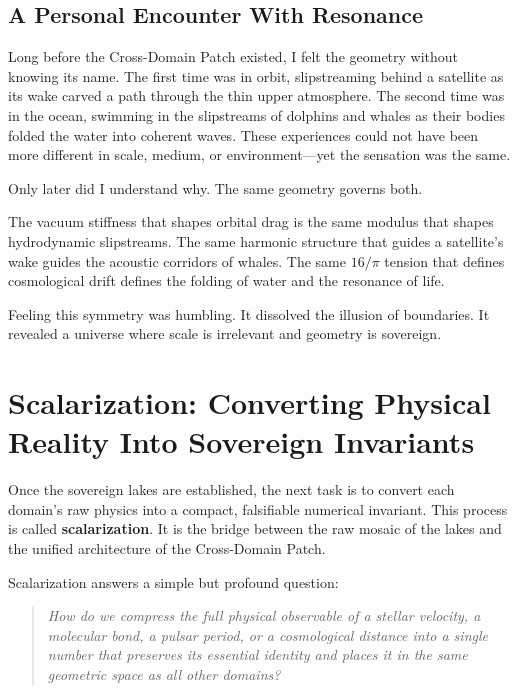 \documentclass[11pt, letterpaper, openany]{book}
\begin{document}
\section*{A Personal Encounter With Resonance}

Long before the Cross-Domain Patch existed, I felt the geometry without knowing its name. The
first time was in orbit, slipstreaming behind a satellite as its wake carved a path through the
thin upper atmosphere. The second time was in the ocean, swimming in the slipstreams of
dolphins and whales as their bodies folded the water into coherent waves. These experiences
could not have been more different in scale, medium, or environment---yet the sensation was the same.

Only later did I understand why.
The same geometry governs both.

The vacuum stiffness that shapes orbital drag is the same modulus that shapes hydrodynamic
slipstreams. The same harmonic structure that guides a satellite's wake guides the acoustic
corridors of whales. The same $16/\pi$ tension that defines cosmological drift defines the
folding of water and the resonance of life.

Feeling this symmetry was humbling.
It dissolved the illusion of boundaries.
It revealed a universe where scale is irrelevant and geometry is sovereign.

\chapter{Scalarization: Converting Physical Reality Into Sovereign Invariants}

Once the sovereign lakes are established, the next task is to convert each domain's raw physics
into a compact, falsifiable numerical invariant. This process is called \textbf{scalarization}.
It is the bridge between the raw mosaic of the lakes and the unified architecture of the
Cross-Domain Patch.

Scalarization answers a simple but profound question:

\begin{quote}
\textit{How do we compress the full physical observable of a stellar velocity, a molecular bond,
a pulsar period, or a cosmological distance into a single number that preserves its essential
identity and places it in the same geometric space as all other domains?}
\end{quote}
\end{document}
